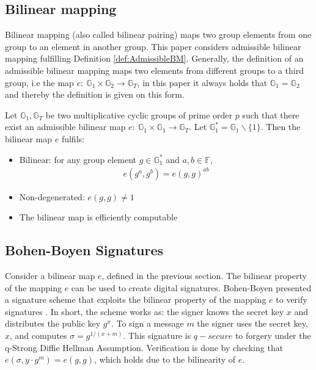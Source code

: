 \subsection*{Bilinear mapping}
\label{sec:bilinear}
Bilinear mapping (also called bilinear pairing) maps two group elements from one group to an element in another group. This paper considers admissible bilinear mapping fulfilling Definition \ref{def:AdmissibleBM}. Generally, the definition of an admissible bilinear mapping maps two elements from different groups to a third group, i.e the map $e: \: \mathds{G}_1\times \mathds{G}_2 \to \mathds{G}_T$,  in this paper it always holds that $\mathds{G}_1=\mathds{G}_2$ and thereby the definition is given on this form. 
\begin{Mydef}
	\label{def:AdmissibleBM}
	Let $\mathds{G}_1,\mathds{G}_T$ be two multiplicative cyclic groups of prime order $p$ such that there exist an admissible bilinear map $e: \: \mathds{G}_1\times \mathds{G}_1 \to \mathds{G}_T$. Let $\mathds{G}_1^*=\mathds{G}_1\backslash \{1\}$.  Then the bilinear map $e$ fulfils:
	\begin{itemize}
		\item Bilinear: for any group element  $g\in\mathds{G}_1^*$ and $a,b \in \mathds{F}$,
		\begin{align*}
			e(g^a,g^b) = e(g,g)^{ab}
		\end{align*}	
		\item Non-degenerated: $e(g,g)\neq 1$	 
		\item The bilinear map is efficiently computable
	\end{itemize}
\end{Mydef}

\subsection*{Bohen-Boyen Signatures}
Consider a bilinear map $e$, defined in the previous section. The bilinear property of the mapping $e$ can be used to create digital signatures. Bohen-Boyen presented a signature scheme that exploits the bilinear property of the mapping $e$ to verify signatures \cite{Bohen-Boyen}.  In short, the scheme works as: the signer knows the secret key $x$ and distributes the public key $g^x$. To sign a message $m$ the signer uses the secret key, $x$, and computes $\sigma = g^{1/(x+m)}$. This signature is $q-secure$ to forgery under the q-Strong Diffie Hellman Assumption. Verification is done by checking that $e(\sigma,y\cdot g^m) = e(g,g)$, which holds due to the bilinearity of $e$. 


